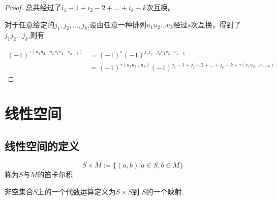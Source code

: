 \documentclass[blue,normal,cn]{elegantnote}
\begin{document}
\begin{proof}
    总共经过了$i_1-1+i_2-2+...+i_k-k$次互换。

    对于任意给定的$j_1,j_2,...,j_k$,设由任意一种排列$u_1u_2...u_k$经过$s$次互换，得到了$j_1 j_2...j_k$,则有

    \begin{equation*}
        \begin{aligned}
           (-1)^{\tau(u_1 u_2 ... u_kv_1 v_2 ... v_{n-k})}&=(-1)^s (-1)^{j_1 j_2... j_k v_1 v_2 ... v_{n-k}}\\
           &=(-1)^{\tau(u_1 u_2 ... u_k)}(-1)^{j_1-1+j_2-2+...+j_k-k +\tau(v_1 u_2 ... v_{n-k})}
        \end{aligned}
    \end{equation*}



\end{proof}



\section{线性空间}
\subsection{线性空间的定义}

\begin{definition}
    $$S\times M:=\{(a,b)|a∈ S,b ∈ M\}$$
称为$S$与$M$的笛卡尔积
\end{definition}

\begin{definition}
   非空集合$S$上的一个代数运算定义为$S\times S$到 $S$的一个映射.
\end{definition}
\end{document}
